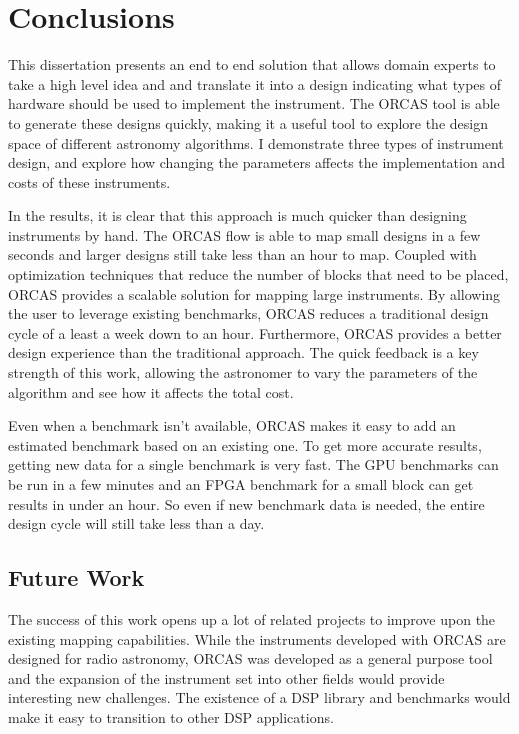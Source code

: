 \chapter{Conclusions}
\label{chap:Conclusions}


This dissertation presents an end to end solution that allows domain experts to take a high level idea and and translate it into a design indicating what types of hardware should be used to implement the instrument. 
The ORCAS tool is able to generate these designs quickly, making it a useful tool to explore the design space of different astronomy algorithms.
I demonstrate three types of instrument design, and explore how changing the parameters affects the implementation and costs of these instruments.

In the results, it is clear that this approach is much quicker than designing instruments by hand. 
The ORCAS flow is able to map small designs in a few seconds and larger designs still take less than an hour to map.
Coupled with optimization techniques that reduce the number of blocks that need to be placed, ORCAS provides a scalable solution for mapping large instruments.
By allowing the user to leverage existing benchmarks, ORCAS reduces a traditional design cycle of a least a week down to an hour.
Furthermore, ORCAS provides a better design experience than the traditional approach.
The quick feedback is a key strength of this work, allowing the astronomer to vary the parameters of the algorithm and see how it affects the total cost.

Even when a benchmark isn't available, ORCAS makes it easy to add an estimated benchmark based on an existing one.
To get more accurate results, getting new data for a single benchmark is very fast.
The GPU benchmarks can be run in a few minutes and an FPGA benchmark for a small block can get results in under an hour.
So even if new benchmark data is needed, the entire design cycle will still take less than a day.

\section{Future Work}
The success of this work opens up a lot of related projects to improve upon the existing mapping capabilities.
While the instruments developed with ORCAS are designed for radio astronomy, ORCAS was developed as a general purpose tool and the expansion of the instrument set into other fields would provide interesting new challenges.
The existence of a DSP library and benchmarks would make it easy to transition to other DSP applications.

